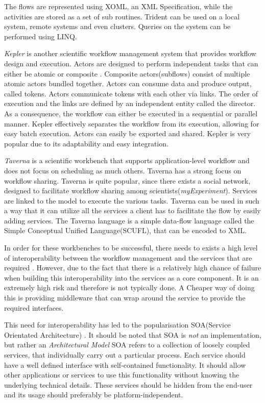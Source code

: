 \documentclass[12pt,a4paper]{report}
\begin{document}
The flows are represented using XOML, an XML Specification, while the
activities are stored as a set of sub routines\cite{Simmhan2011790}. Trident
can be used on a local system, remote systems and even clusters.  Queries on
the system can be performed using LINQ.


\emph{Kepler} is another scientific workflow management system that
provides workflow design and execution.  Actors are designed to perform
independent tasks that can either be atomic or  composite
\cite{Wang:2009:KHG:1645164.1645176}.  Composite actors(subflows) consist of
multiple   atomic actors bundled together. Actors can consume data and produce
output, called tokens. Actors communicate tokens with each other via links. The
order of execution and the links are defined by an independent entity called
the director. As a consequence, the workflow can either be executed in a
sequential or parallel manner. Kepler effectively separates the workflow from
its execution, allowing for easy batch execution. Actors can easily be exported
and shared.  Kepler is very popular due to its adaptability and easy
integration.

    \emph{Taverna} is a scientific workbench that supports application-level
workflow and does not focus on scheduling as much others\cite{4721191}. Taverna
has a strong focus on workflow sharing. Taverna is quite popular, since there
exists a social network, designed to facilitate workflow sharing among
scientists(\emph{myExperiment}). Services are linked to the model to execute
the various tasks. Taverna can be used in such a way that it can utilize all
the services a client has to facilitate the flow by easily adding services. The
Taverna language is a simple data-flow language called the Simple Conceptual
Unified Language(SCUFL), that can be encoded to XML.

In order for these workbenches to be successful, there needs to exists a
high level of interoperability between the workflow management and the services
that are required \cite{Shegalov:2001:XWM:767132.767139}.  However, due to the
fact that there is a relatively high chance of failure when building this
interoperability into the services as a core component. It is an extremely high
risk and therefore is not typically done. A Cheaper way of doing this is
providing middleware that can wrap around the service to provide the required
interfaces.

This need for interoperability has led to the popularisation SOA(Service
Orientated Architecture) \cite{Sanders:2008:SSA:1400549.1400595}.  It should be
noted that SOA is \emph{not} an implementation, but rather an
\emph{Architectural Model} SOA refers to a collection of loosely coupled
services, that individually carry out a particular process. Each service should
have a well defined interface with self-contained functionality. It should
allow other applications or services to use this functionality without knowing
the underlying technical details. These services should be hidden from the
end-user and its usage should preferably be platform-independent.
\end{document}
